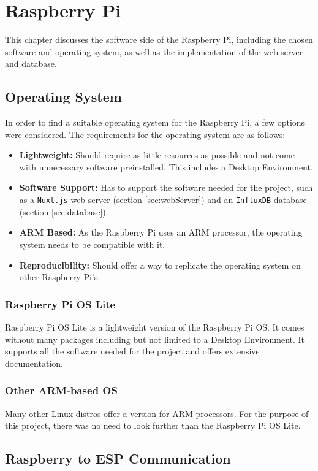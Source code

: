 \chapter{Raspberry Pi} 
This chapter discusses the software side of the Raspberry Pi,
including the chosen software and operating system, as well 
as the implementation of the web server and database.
    \section{Operating System}
    In order to find a suitable operating system for the Raspberry Pi, a few options
    were considered. The requirements for the operating system are as follows:
    \begin{itemize}
        \item \textbf{Lightweight:} Should require as little resources as possible
        and not come with unnecessary software preinstalled. This includes a Desktop 
        Environment.
        \item \textbf{Software Support:} Has to support the software needed for the
        project, such as a \texttt{Nuxt.js} web server (section \ref{sec:webServer})
        and an \texttt{InfluxDB} database (section \ref{sec:database}).
        \item \textbf{ARM Based:} As the Raspberry Pi uses an ARM processor, the
        operating system needs to be compatible with it.
        \item \textbf{Reproducibility:} Should offer a way to replicate the operating
        system on other Raspberry Pi's.
    \end{itemize}
        \subsection{Raspberry Pi OS Lite}
        Raspberry Pi OS Lite is a lightweight version of the Raspberry Pi OS. It
        comes without many packages including but not limited to a Desktop Environment.
        It supports all the software needed for the project and offers extensive documentation.
        \subsection{Other ARM-based OS}
        Many other Linux distros offer a version for ARM processors. For the purpose of
        this project, there was no need to look further than the Raspberry Pi OS Lite.
    \section{Raspberry to ESP Communication}
